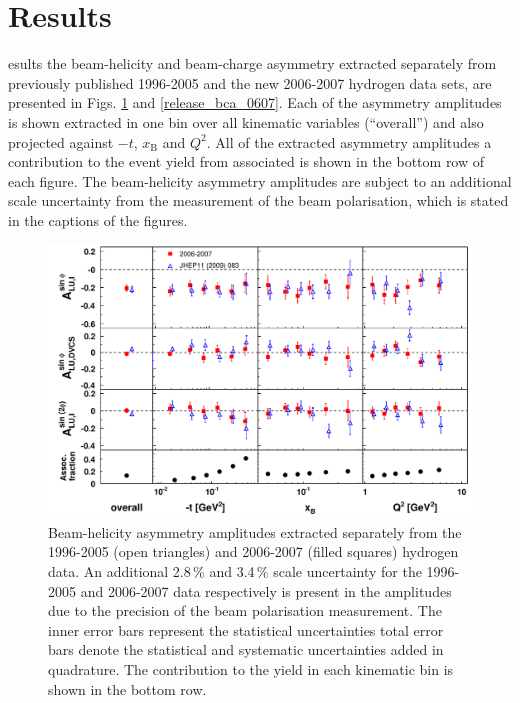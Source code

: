 \section{Results}
esults  the beam-helicity and beam-charge asymmetry  extracted separately from previously published 1996-2005 and the new 2006-2007 hydrogen data sets, are presented in Figs. \ref{release_bsa_0607} and \ref{release_bca_0607}. Each of the asymmetry amplitudes is shown extracted in one bin over all kinematic variables (``overall'') and also projected against $-t$, $x_{\textrm{B}}$ and $Q^{2}$. All of the extracted asymmetry amplitudes  a  contribution to the event yield from associated  is shown in the bottom row of each figure. The beam-helicity asymmetry amplitudes are subject to an additional scale uncertainty from the measurement of the beam polarisation, which is stated in the captions of the figures.
\begin{figure}
\begin{center}
\includegraphics[width=15cm,keepaspectratio]{bsadvcsplots_eml_par13_bin6_release_pic_update_0607_9605}
  \caption{Beam-helicity asymmetry amplitudes extracted separately from
the 1996-2005 (open triangles) and 2006-2007 (filled squares)
hydrogen data.   
An additional 2.8\,\% and 3.4\,\% scale uncertainty for the 1996-2005 and
2006-2007 data respectively is present in the amplitudes due to the precision of
the beam polarisation measurement. The inner error bars represent the statistical uncertainties total error bars denote the statistical and systematic uncertainties added in quadrature. The  contribution  to the yield in each kinematic bin is shown in the bottom row.}
 \label{release_bsa_0607}
\end{center}
 \end{figure}

